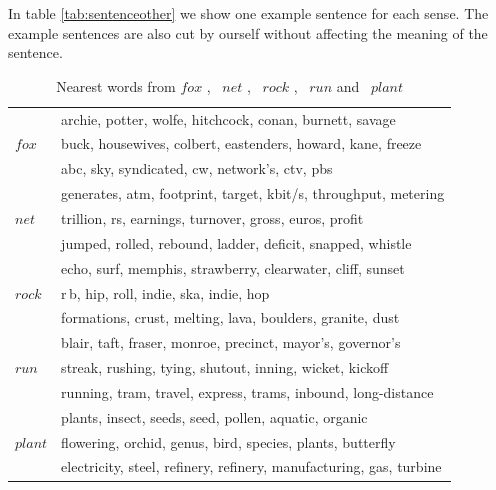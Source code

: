 In table \ref{tab:sentenceother} we show one example sentence for each sense.
The example sentences are also cut by ourself without affecting the meaning of the sentence. 


\begin{table}[tb]
\caption{Nearest words from $fox$ , \ $net$ , \ $rock$ , \ $run$ and \ $plant$} \label{tab:nearestwordsother} 
\begin{center} 
\begin{tabular}{|l|l|}
\hline
\multirow{3}{*}{$fox$}   
& archie, potter, wolfe, hitchcock, conan, burnett, savage  \\ 
& buck, housewives, colbert, eastenders, howard, kane, freeze
 \\ 
& abc, sky, syndicated, cw, network's, ctv, pbs \\ 
\hline
\multirow{3}{*}{$net$}  
& generates, atm, footprint, target, kbit/s, throughput, metering   \\  
& trillion, rs, earnings, turnover, gross, euros, profit  \\  
&jumped, rolled, rebound, ladder, deficit, snapped, whistle   \\  
\hline 
\multirow{3}{*}{$rock$}  
&echo, surf, memphis, strawberry, clearwater, cliff, sunset  \\  
& r$\,$b, hip, roll, indie, ska, indie, hop  
 \\  
&formations, crust, melting, lava, boulders, granite, dust   \\  
\hline 
\multirow{3}{*}{$run$}
& blair, taft, fraser, monroe, precinct, mayor's, governor's  \\  
& streak, rushing, tying, shutout, inning, wicket, kickoff
 \\  
& running, tram, travel, express, trams, inbound, long-distance \\
\hline  
\multirow{3}{*}{$plant$}
& plants, insect, seeds, seed, pollen, aquatic, organic  \\  
& flowering, orchid, genus, bird, species, plants, butterfly
 \\  
& electricity, steel, refinery, refinery, manufacturing, gas, turbine  \\
\hline
\end{tabular}
\end{center}
\end{table}


